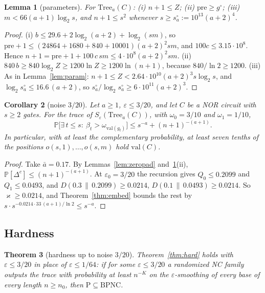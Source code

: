 \documentclass[11pt]{amsart}
\newtheorem{theorem}{Theorem}
\newtheorem{lemma}[theorem]{Lemma}
\newtheorem{corollary}[theorem]{Corollary}
\theoremstyle{definition}
\theoremstyle{remark}
\newcommand{\eps}{\varepsilon}
\newcommand{\val}{\mathrm{val}}
\newcommand{\PP}{\mathbb{P}}
\begin{document}
\begin{lemma}[parameters]\label{lem:param2}
For $\mathrm{Tree}_a(C)$: (i) $n+1\le Z$; (ii) $\mathrm{pre}\ge g^\circ$; (iii)
$m<66(a+1)\log_2s$, and $n+1\le s^2$ whenever $s\ge s^\circ_a:=10^{13}(a+2)^4$.
\end{lemma}

\begin{proof}
(i) $b\le29.6+2\log_2(a+2)+\log_2(sm)$, so
$\mathrm{pre}+1\le(24864+1680+840+10001)(a+2)^2sm$, and $100c\le3.15\cdot10^8$. Hence
$n+1=\mathrm{pre}+1+100\,c\,sm\le4\cdot10^8(a+2)^2sm$.
(ii) $840\,b\ge840\log_2Z\ge1200\ln Z\ge1200\ln(n+1)$, because $840/\ln2\ge1200$.
(iii) As in Lemma~\ref{lem:param}: $n+1\le Z<2.64\cdot10^{10}(a+2)^3s\log_2s$, and
$\log_2s^\circ_a\le16.6\,(a+2)$, so $s^\circ_a/\log_2s^\circ_a\ge6\cdot10^{11}(a+2)^3$.
\end{proof}

\begin{corollary}[noise $3/20$]\label{cor:threetwentieths}
Let $a\ge1$, $\eps\le3/20$, and let $C$ be a NOR circuit with $s\ge2$ gates. For the trace of
$S_\eps(\mathrm{Tree}_a(C))$, with $\omega_0=3/10$ and $\omega_1=1/10$,
\[
\PP\bigl[\exists\,t\le s:\ \beta_t>\omega_{\val(g_t)}\bigr]\le s^{-a}+(n+1)^{-(a+1)} .
\]
In particular, with at least the complementary probability, at least seven tenths of the
positions $o(s,1),\dots,o(s,m)$ hold $\val(C)$.
\end{corollary}

\begin{proof}
Take $\bar a=0.17$. By Lemmas~\ref{lem:zeropad} and~\ref{lem:param2}(ii),
$\PP[\Delta^c]\le(n+1)^{-(a+1)}$. At $\eps_0=3/20$ the recursion gives $Q_0\le0.2099$ and
$Q_1\le0.0493$, and $D(0.3\,\|\,0.2099)\ge0.0214$, $D(0.1\,\|\,0.0493)\ge0.0214$. So
$\varkappa\ge0.0214$, and Theorem~\ref{thm:embed} bounds the rest by
$s\cdot s^{-0.0214\cdot33\,(a+1)/\ln2}\le s^{-a}$.
\end{proof}

\subsection{Hardness}

\begin{theorem}[hardness up to noise $3/20$]\label{thm:hard2}
Theorem~\ref{thm:hard} holds with $\eps\le3/20$ in place of $\eps\le1/64$: if for some
$\eps\le3/20$ a randomized NC family outputs the trace with probability at least $n^{-K}$ on the
$\eps$-smoothing of every base of every length $n\ge n_0$, then $\mathrm P\subseteq\mathrm{BPNC}$.
\end{theorem}
\end{document}
